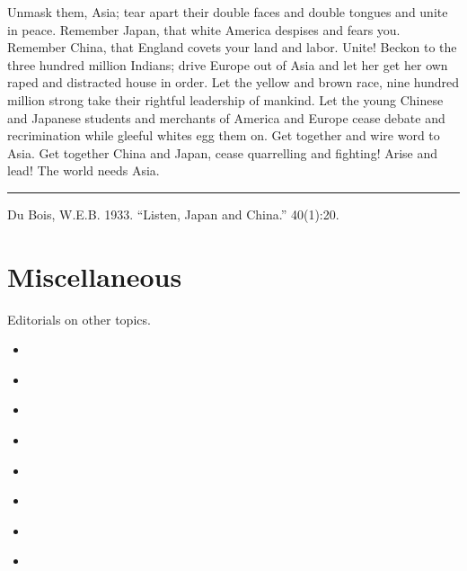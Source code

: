 \documentclass[letterpaper,10pt,english]{jupyterBook}
\begin{document}
\sphinxAtStartPar
Unmask them, Asia; tear apart their double faces and double tongues and unite in peace. Remember Japan, that white America despises and fears you. Remember China, that England covets your land and labor. Unite! Beckon to the three hundred million Indians; drive Europe out of Asia and let her get her own raped and distracted house in order. Let the yellow and brown race, nine hundred million strong take their rightful leadership of mankind. Let the young Chinese and Japanese students and merchants of America and Europe cease debate and recrimination while gleeful whites egg them on. Get together and wire word to Asia. Get together China and Japan, cease quarrelling and fighting! Arise and lead! The world needs Asia.


\bigskip\hrule\bigskip


\sphinxAtStartPar
{} Du Bois, W.E.B. 1933. “Listen, Japan and China.”  40(1):20.


\section{Miscellaneous}
\label{\detokenize{Sections/misc:miscellaneous}}\label{\detokenize{Sections/misc::doc}}
\sphinxAtStartPar
Editorials on other topics.
\begin{itemize}
\item {} 
\sphinxAtStartPar
{\hyperref[\detokenize{Volumes/03/05/lee::doc}]{}}

\item {} 
\sphinxAtStartPar
{\hyperref[\detokenize{Volumes/09/02/negro::doc}]{}}

\item {} 
\sphinxAtStartPar
{\hyperref[\detokenize{Volumes/06/07/national_emancipation_exposition::doc}]{}}

\item {} 
\sphinxAtStartPar
{\hyperref[\detokenize{Volumes/11/02/star_of_ethiopia::doc}]{}}

\item {} 
\sphinxAtStartPar
{\hyperref[\detokenize{Volumes/18/03/reconstruction::doc}]{}}

\item {} 
\sphinxAtStartPar
{\hyperref[\detokenize{Volumes/19/01/social_equity::doc}]{}}

\item {} 
\sphinxAtStartPar
{\hyperref[\detokenize{Volumes/34/02/farmers::doc}]{}}

\item {} 
\sphinxAtStartPar
{\hyperref[\detokenize{Volumes/39/01/john_brown::doc}]{}}

\end{itemize}
\end{document}
